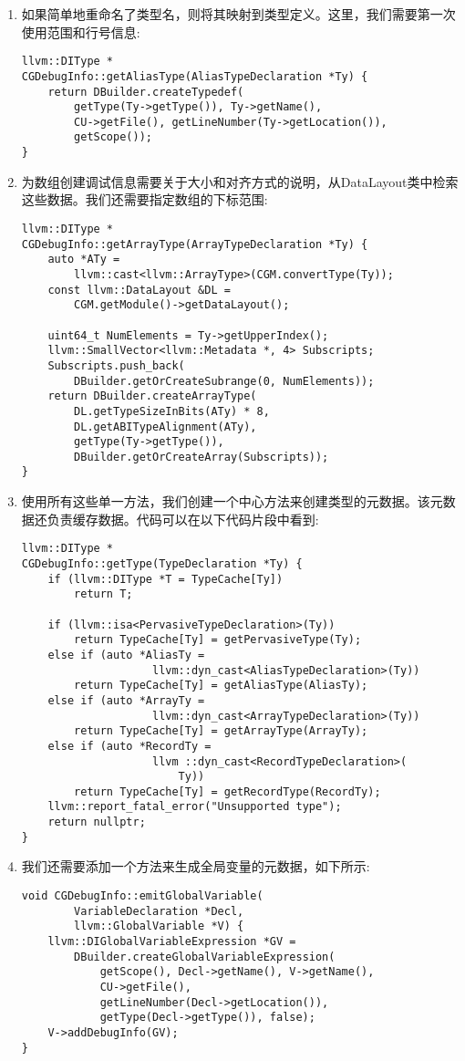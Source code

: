 \begin{enumerate}
\item 如果简单地重命名了类型名，则将其映射到类型定义。这里，我们需要第一次使用范围和行号信息:
\begin{lstlisting}[caption={}]
llvm::DIType *
CGDebugInfo::getAliasType(AliasTypeDeclaration *Ty) {
	return DBuilder.createTypedef(
		getType(Ty->getType()), Ty->getName(),
		CU->getFile(), getLineNumber(Ty->getLocation()),
		getScope());
}
\end{lstlisting}

\item 为数组创建调试信息需要关于大小和对齐方式的说明，从DataLayout类中检索这些数据。我们还需要指定数组的下标范围:
\begin{lstlisting}[caption={}]
llvm::DIType *
CGDebugInfo::getArrayType(ArrayTypeDeclaration *Ty) {
	auto *ATy =
		llvm::cast<llvm::ArrayType>(CGM.convertType(Ty));
	const llvm::DataLayout &DL =
		CGM.getModule()->getDataLayout();
		
	uint64_t NumElements = Ty->getUpperIndex();
	llvm::SmallVector<llvm::Metadata *, 4> Subscripts;
	Subscripts.push_back(
		DBuilder.getOrCreateSubrange(0, NumElements));
	return DBuilder.createArrayType(
		DL.getTypeSizeInBits(ATy) * 8,
		DL.getABITypeAlignment(ATy),
		getType(Ty->getType()),
		DBuilder.getOrCreateArray(Subscripts));
}
\end{lstlisting}

\item 使用所有这些单一方法，我们创建一个中心方法来创建类型的元数据。该元数据还负责缓存数据。代码可以在以下代码片段中看到:
\begin{lstlisting}[caption={}]
llvm::DIType *
CGDebugInfo::getType(TypeDeclaration *Ty) {
	if (llvm::DIType *T = TypeCache[Ty])
		return T;
	
	if (llvm::isa<PervasiveTypeDeclaration>(Ty))
		return TypeCache[Ty] = getPervasiveType(Ty);
	else if (auto *AliasTy =
					llvm::dyn_cast<AliasTypeDeclaration>(Ty))
		return TypeCache[Ty] = getAliasType(AliasTy);
	else if (auto *ArrayTy =
					llvm::dyn_cast<ArrayTypeDeclaration>(Ty))
		return TypeCache[Ty] = getArrayType(ArrayTy);
	else if (auto *RecordTy =
					llvm ::dyn_cast<RecordTypeDeclaration>(
						Ty))
		return TypeCache[Ty] = getRecordType(RecordTy);
	llvm::report_fatal_error("Unsupported type");
	return nullptr;
}
\end{lstlisting}

\item 我们还需要添加一个方法来生成全局变量的元数据，如下所示:
\begin{lstlisting}[caption={}]
void CGDebugInfo::emitGlobalVariable(
		VariableDeclaration *Decl,
		llvm::GlobalVariable *V) {
	llvm::DIGlobalVariableExpression *GV =	
		DBuilder.createGlobalVariableExpression(
			getScope(), Decl->getName(), V->getName(),
			CU->getFile(),
			getLineNumber(Decl->getLocation()),
			getType(Decl->getType()), false);
	V->addDebugInfo(GV);
}
\end{lstlisting}


\end{enumerate}
